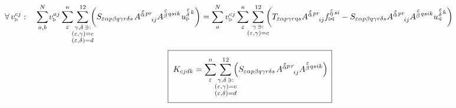 \begin{equation}
   \hspace{-18mm}
   \forall \, v^{c j}_{\triangleright}: \quad
   \sum^N_{a,b} \mkern-2mu v^{a  j}_{\triangleright}
   \sum^n_\varepsilon
   \mkern-7mu
   \sum_{\substack{\gamma, \delta \, \ni: \\
      (\varepsilon,\gamma) = c \\ (\varepsilon,\delta) = d}}^{12}
   \mkern-10mu
   \qty(
   S_{\varepsilon   \alpha p   \beta q   \gamma r   \delta s} \mkern2mu
   A^{\substack{\mkern2mu \varepsilon \\[-0.65mm] \alpha} \mkern2mu p r}_{\mkern29mu i j}
   A^{\substack{\mkern2mu \varepsilon \\[0.05mm] \beta} \mkern2mu q s i k} \mkern1mu
   u^{\substack{\mkern2mu \varepsilon \\[0.09mm] \delta} \mkern2mu k}_\triangleright )
   =
   \sum^N_a v^{c j}_{\triangleright}
   \sum^n_\varepsilon
   \mkern-7mu
   \sum_{\substack{\gamma \, \ni: \\ (\varepsilon,\gamma) = c}}^{12}
   \mkern-10mu
   \qty(
   T_{\varepsilon   \alpha p   \gamma r   \eta s}
   A^{\substack{\mkern2mu \varepsilon \\[-0.65mm] \alpha} \mkern2mu p r}_{\mkern29mu i j}
   f^{\substack{\mkern2mu \varepsilon \\[-0.59mm] \eta} \mkern2mu s i}_{\bowtie}
   -
   S_{\varepsilon   \alpha p   \beta q   \gamma r   \delta s}
   A^{\substack{\mkern2mu \varepsilon \\[-0.65mm] \alpha} \mkern2mu p r}_{\mkern29mu i j}
   A^{\substack{\mkern2mu \varepsilon \\[0.05mm] \beta} \mkern2mu q s i k}
   u^{\substack{\mkern2mu \varepsilon \\[0.09mm] \delta} \mkern2mu k}_\triangleleft )
\end{equation}
\begin{equation}
   \boxed{ \phantom{\rule[-12mm]{1mm}{20mm}}
   K_{cjdk} =
   \sum^n_\varepsilon
   \mkern-7mu
   \sum_{\substack{\gamma, \delta \, \ni: \\
      (\varepsilon,\gamma) = c \\ (\varepsilon,\delta) = d}}^{12}
   \mkern-10mu
   \qty(
   S_{\varepsilon   \alpha p   \beta q   \gamma r   \delta s} \mkern2mu
   A^{\substack{\mkern2mu \varepsilon \\[-0.65mm] \alpha} p \mkern2mu r}_{\mkern29mu i j}
   A^{\substack{\mkern2mu \varepsilon \\[0.05mm] \beta} \mkern2mu  q s i k} ) \mkern3mu }
\end{equation}
